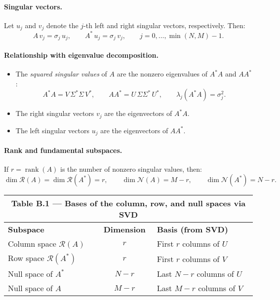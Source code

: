 \paragraph{Singular vectors.}
Let \(u_j\) and \(v_j\) denote the \(j\)-th left and right singular vectors, respectively.
Then:
\[
A\,v_j = \sigma_j\,u_j, \qquad A^{*}\,u_j = \sigma_j\,v_j, \qquad j = 0, \ldots, \min(N,M) - 1. \tag{B.19, B.20}
\]

\paragraph{Relationship with eigenvalue decomposition.}
\begin{itemize}
  \item The \emph{squared singular values} of \(A\) are the nonzero eigenvalues of \(A^{*}A\) and \(AA^{*}\):
  \[
  A^{*}A = V\,\Sigma^{*}\Sigma\,V^{*}, \qquad
  AA^{*} = U\,\Sigma\Sigma^{*}\,U^{*}, \qquad
  \lambda_j(A^{*}A) = \sigma_j^2.
  \]
  \item The right singular vectors \(v_j\) are the eigenvectors of \(A^{*}A\).
  \item The left singular vectors \(u_j\) are the eigenvectors of \(AA^{*}\).
\end{itemize}

\paragraph{Rank and fundamental subspaces.}
If \(r = \operatorname{rank}(A)\) is the number of nonzero singular values, then:
\[
\dim \mathcal{R}(A) = \dim \mathcal{R}(A^{*}) = r, \qquad
\dim \mathcal{N}(A) = M - r, \qquad
\dim \mathcal{N}(A^{*}) = N - r.
\]

\begin{center}
\begin{tabular}{lcl}
\multicolumn{3}{c}{\textbf{Table B.1 — Bases of the column, row, and null spaces via SVD}}\\
\hline
\textbf{Subspace} & \textbf{Dimension} & \textbf{Basis (from SVD)} \\
\hline
Column space \(\mathcal{R}(A)\) & \(r\) & First \(r\) columns of \(U\) \\
Row space \(\mathcal{R}(A^{*})\) & \(r\) & First \(r\) columns of \(V\) \\
Null space of \(A^{*}\) & \(N-r\) & Last \(N-r\) columns of \(U\) \\
Null space of \(A\) & \(M-r\) & Last \(M-r\) columns of \(V\) \\
\hline
\end{tabular}
\end{center}


